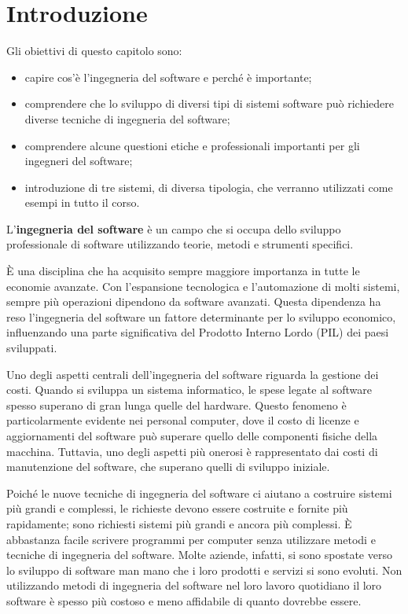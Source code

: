 \chapter{Introduzione}

Gli obiettivi di questo capitolo sono: 
\begin{itemize}
    \item capire cos'è l'ingegneria del software e perché è importante; 
    \item comprendere che lo sviluppo di diversi tipi di sistemi software può richiedere diverse tecniche di ingegneria del software; 
    \item comprendere alcune questioni etiche e professionali importanti per gli ingegneri del software; \item introduzione di tre sistemi, di diversa tipologia, che verranno utilizzati come esempi in tutto il corso.
\end{itemize}

\begin{redbar}
L'\textbf{ingegneria del software} è un campo che si occupa dello sviluppo professionale di software utilizzando teorie, metodi e strumenti specifici.
\end{redbar}

È una disciplina che ha acquisito sempre maggiore importanza in tutte le economie avanzate. Con l'espansione tecnologica e l'automazione di molti sistemi, sempre più operazioni dipendono da software avanzati. Questa dipendenza ha reso l'ingegneria del software un fattore determinante per lo sviluppo economico, influenzando una parte significativa del Prodotto Interno Lordo (PIL) dei paesi sviluppati.

Uno degli aspetti centrali dell'ingegneria del software riguarda la gestione dei costi. Quando si sviluppa un sistema informatico, le spese legate al software spesso superano di gran lunga quelle del hardware. Questo fenomeno è particolarmente evidente nei personal computer, dove il costo di licenze e aggiornamenti del software può superare quello delle componenti fisiche della macchina. Tuttavia, uno degli aspetti più onerosi è rappresentato dai costi di manutenzione del software, che superano quelli di sviluppo iniziale.

Poiché le nuove tecniche di ingegneria del software ci aiutano a costruire sistemi più grandi e complessi, le richieste devono essere costruite e fornite più rapidamente; sono richiesti sistemi più grandi e ancora più complessi. È abbastanza facile scrivere programmi per computer senza utilizzare metodi e tecniche di ingegneria del software. Molte aziende, infatti, si sono spostate verso lo sviluppo di software man mano che i loro prodotti e servizi si sono evoluti. Non utilizzando metodi di ingegneria del software nel loro lavoro quotidiano il loro software è spesso più costoso e meno affidabile di quanto dovrebbe essere.


